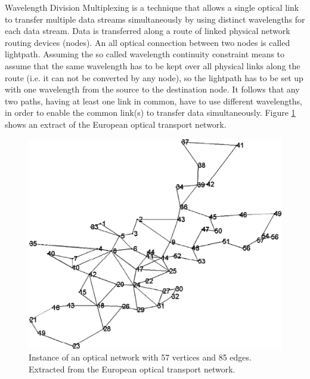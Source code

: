 Wavelength Division Multiplexing is a technique that allows a single optical link to transfer multiple data streams simultaneously by using distinct wavelengths for each data stream. Data is transferred along a route of linked physical network routing devices (nodes). An all optical connection between two nodes is called lightpath. Assuming the so called wavelength continuity constraint \cite{markovic-10} means to assume that the same wavelength has to be kept over all physical links along the route (i.e. it can not be converted by any node), so the lightpath has to be set up with one wavelength from the source to the destination node. It follows that any two paths, having at least one link in common, have to use different wavelengths, in order to enable the common link(s) to transfer data simultaneously. Figure \ref{pd:opticalNetwork} shows an extract of the European optical transport network.\\

\begin{figure}
\begin{center}
\includegraphics[scale=0.2]{figures/rwa.png}
\caption{Instance of an optical network with 57 vertices and 85 edges. Extracted from the European optical transport network. \cite{belgacem-13}}
\label{pd:opticalNetwork}
\end{center}
\end{figure}
  
